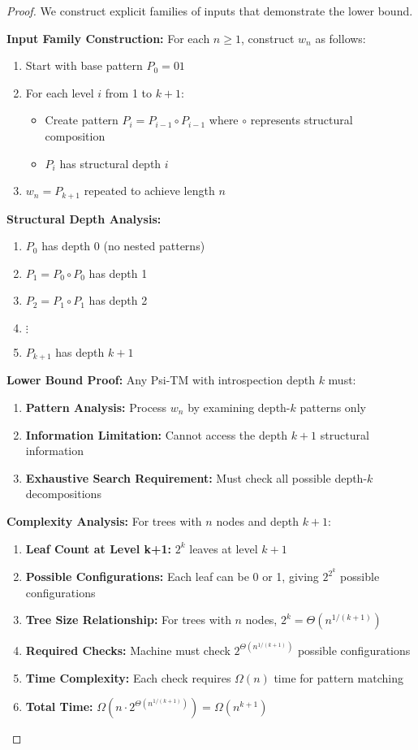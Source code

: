 \documentclass[11pt]{article}
\begin{document}
\begin{proof}
We construct explicit families of inputs that demonstrate the lower bound.

\textbf{Input Family Construction:}
For each $n \geq 1$, construct $w_n$ as follows:
\begin{enumerate}
\item Start with base pattern $P_0 = 01$
\item For each level $i$ from 1 to $k+1$:
   \begin{itemize}
   \item Create pattern $P_i = P_{i-1} \circ P_{i-1}$ where $\circ$ represents structural composition
   \item $P_i$ has structural depth $i$
   \end{itemize}
\item $w_n = P_{k+1}$ repeated to achieve length $n$
\end{enumerate}

\textbf{Structural Depth Analysis:}
\begin{enumerate}
\item $P_0$ has depth 0 (no nested patterns)
\item $P_1 = P_0 \circ P_0$ has depth 1
\item $P_2 = P_1 \circ P_1$ has depth 2
\item $\vdots$
\item $P_{k+1}$ has depth $k+1$
\end{enumerate}

\textbf{Lower Bound Proof:}
Any Psi-TM with introspection depth $k$ must:

\begin{enumerate}
\item \textbf{Pattern Analysis:} Process $w_n$ by examining depth-$k$ patterns only
\item \textbf{Information Limitation:} Cannot access the depth $k+1$ structural information
\item \textbf{Exhaustive Search Requirement:} Must check all possible depth-$k$ decompositions
\end{enumerate}

\textbf{Complexity Analysis:}
For trees with $n$ nodes and depth $k+1$:

\begin{enumerate}
\item \textbf{Leaf Count at Level k+1:} $2^k$ leaves at level $k+1$
\item \textbf{Possible Configurations:} Each leaf can be 0 or 1, giving $2^{2^k}$ possible configurations
\item \textbf{Tree Size Relationship:} For trees with $n$ nodes, $2^k = \Theta(n^{1/(k+1)})$
\item \textbf{Required Checks:} Machine must check $2^{\Theta(n^{1/(k+1)})}$ possible configurations
\item \textbf{Time Complexity:} Each check requires $\Omega(n)$ time for pattern matching
\item \textbf{Total Time:} $\Omega(n \cdot 2^{\Theta(n^{1/(k+1)})}) = \Omega(n^{k+1})$
\end{enumerate}


\end{proof}
\end{document}
